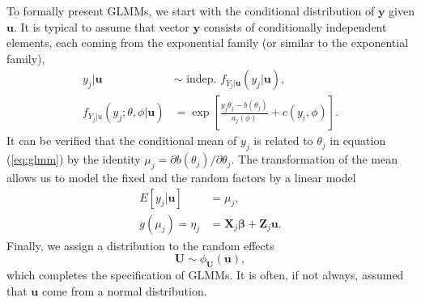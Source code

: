 To formally present GLMMs, we start with the conditional distribution of $\bm y$ given $\bm u$. It
is typical to assume that vector $\bm y$ consists of conditionally independent elements, each coming
from the exponential family (or similar to the exponential family), 
\begin{equation}\label{eq:glmm}
	\begin{split}
		y_j|\bm u & \sim \text{~indep.~} f_{Y_j |\bm u} (y_j|\bm u), \\
		f_{Y_j|u}(y_j; \theta, \phi|\bm u) &= \exp \left[ \frac{y_j\theta_j	 -b(\theta_j)}{a_j(\phi)}
		+ c(y_i, \phi)\right].
	\end{split}
\end{equation}	
It can be verified that the conditional mean of $y_j$ is related to $\theta_j$ in equation
(\ref{eq:glmm}) by the identity $\mu_j = \partial b(\theta_j)/\partial \theta_j$. The transformation
of the mean allows us to model the fixed and the random factors by a linear model
\begin{equation}\label{eq:glmm2}
	\begin{split}
		E[y_j|\bm u] &= \mu_j,\\
		g(\mu_j) = \eta_j &= \bm X_j\bm \beta + \bm Z_j\bm u.
	\end{split}
\end{equation}
Finally, we assign a distribution to the random effects
\begin{equation}
	\bm U \sim \phi_{\bm U}(\bm u),
\end{equation}
which completes the specification of GLMMs. It is often, if not always, assumed that $\bm u$ come
from a normal distribution.

